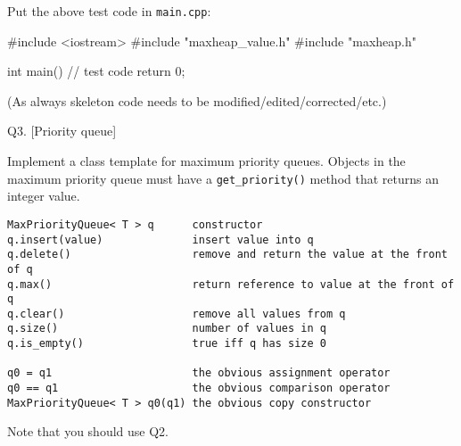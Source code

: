 Put the above test code in \texttt{main.cpp}:
\begin{console}
#include <iostream>
#include "maxheap_value.h"
#include "maxheap.h"

int main()
{
    // test code
    return 0;
}
\end{console}

(As always skeleton code needs to be modified/edited/corrected/etc.)


\newpage
Q3. [Priority queue]

Implement a class template for maximum priority queues.
Objects in the maximum priority queue must have a
\texttt{get\_priority()} method
that returns an integer value.
\begin{Verbatim}[frame=single]
MaxPriorityQueue< T > q      constructor
q.insert(value)              insert value into q
q.delete()                   remove and return the value at the front of q
q.max()                      return reference to value at the front of q
q.clear()                    remove all values from q
q.size()                     number of values in q
q.is_empty()                 true iff q has size 0

q0 = q1                      the obvious assignment operator
q0 == q1                     the obvious comparison operator
MaxPriorityQueue< T > q0(q1) the obvious copy constructor
\end{Verbatim}

Note that you should use Q2.

